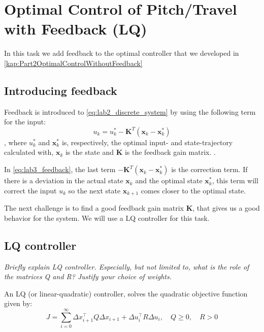 \documentclass[../main.tex]{subfiles}
\begin{document}
	
\section{Optimal Control of Pitch/Travel with Feedback (LQ)}
In this task we add feedback to the optimal controller that we developed in \cref{kap:Part2OptimalControlWithoutFeedback}

\subsection{Introducing feedback}
Feedback is introduced to \cref{eq:lab2_discrete_system} by using the following term for the input:
\begin{equation}\label{eq:lab3_feedback}
	u_k = u_k^* - \bm{K}^T(\bm x_k - \bm x_k^*)
\end{equation}, 
where $ u_k^* $ and $ \bm x_k^* $ is, respectively, the optimal input- and state-trajectory calculated with, $ \bm x_k $ is the state and $ \bm K $ is the feedback gain matrix.
.

In \cref{eq:lab3_feedback}, the last term $ -\bm{K}^T(\bm x_k - \bm x_k^*) $ is the correction term. If there is a deviation in the actual state $ \bm x_k $ and the optimal state $ \bm x_k^* $, this term will correct the input $ u_k $ so the next state $ \bm x_{k + 1} $ comes closer to the optimal state. 

The next challenge is to find a good feedback gain matrix $ \bm K $, that gives us a good behavior for the system. We will use a LQ controller for this task.

\subsection{LQ controller}
\textit{Briefly explain LQ controller. Especially, but not limited to, what is the role of the matrices Q and R? Justify your choice of weights.}

An LQ (or linear-quadratic) controller, solves the quadratic objective function given by: 
\begin{equation}
    J = \sum^\infty_{i=0} \Delta x_{i+1}^\top Q \Delta x_{i+1} + \Delta u_i^\top R \Delta u_i, \quad Q \ge0, \quad R > 0
\end{equation}
\end{document}
